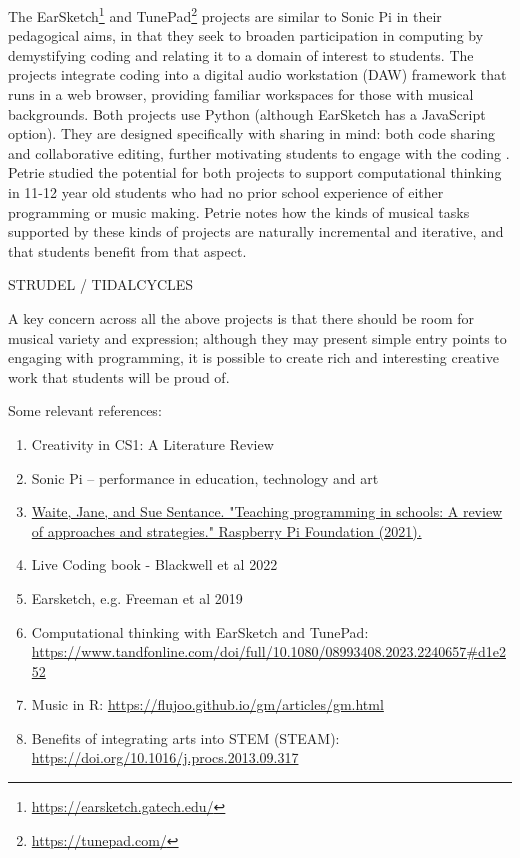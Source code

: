 The EarSketch\footnote{\url{https://earsketch.gatech.edu/}} \cite{engelman_earsketch_2017} and TunePad\footnote{\url{https://tunepad.com/}} projects are similar to Sonic Pi in their pedagogical aims, in that they seek to broaden participation in computing by demystifying coding and relating it to a domain of interest to students. The projects integrate coding into a digital audio workstation (DAW) framework that runs in a web browser, providing familiar workspaces for those with musical backgrounds. Both projects use Python (although EarSketch has a JavaScript option). They are designed specifically with sharing in mind: both code sharing and collaborative editing, further motivating students to engage with the coding \cite{freeman_earsketch_2019}. Petrie \cite{petrie_ct_2024} studied the potential for both projects to support computational thinking in 11-12 year old students who had no prior school experience of either programming or music making. Petrie notes how the kinds of musical tasks supported by these kinds of projects are naturally incremental and iterative, and that students benefit from that aspect.

STRUDEL / TIDALCYCLES


A key concern across all the above projects is that there should be room for musical variety and expression; although they may present simple entry points to engaging with programming, it is possible to create rich and interesting creative work that students will be proud of.


Some relevant references:
\begin{enumerate}
\item Creativity in CS1: A Literature Review \cite{Sharmin2021}
\item Sonic Pi – performance in education, technology and art \cite{Aaron2016}
\item \href{https://www.raspberrypi.org/app/uploads/2021/11/Teaching-programming-in-schools-pedagogy-review-Raspberry-Pi-Foundation.pdf}{Waite, Jane, and Sue Sentance. "Teaching programming in schools: A review of approaches and strategies." Raspberry Pi Foundation (2021).}
\item Live Coding book - Blackwell et al 2022
\item Earsketch, e.g. Freeman et al 2019
\item Computational thinking with EarSketch and TunePad: \url{https://www.tandfonline.com/doi/full/10.1080/08993408.2023.2240657#d1e252}
\item Music in R: \href{https://flujoo.github.io/gm/articles/gm.html}{https://flujoo.github.io/gm/articles/gm.html}
\item Benefits of integrating arts into STEM (STEAM): \href{https://doi.org/10.1016/j.procs.2013.09.317}{https://doi.org/10.1016/j.procs.2013.09.317}
\end{enumerate}

